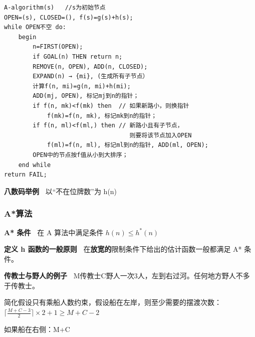 \documentclass[b4paper, 10pt]{ctexart}
\makeatletter
\newenvironment{figurehere}
{\def\@captype{figure}}
{}
\makeatother
\begin{document}
\begin{multicols}{3}
\begin{lstlisting}[basicstyle=\tiny \ttfamily]
A-algorithm(s)   //s为初始节点
OPEN=(s), CLOSED=(), f(s)=g(s)+h(s);
while OPEN不空 do:
    begin
        n=FIRST(OPEN);
        if GOAL(n) THEN return n;
        REMOVE(n, OPEN), ADD(n, CLOSED);
        EXPAND(n) → {mi}, (生成所有子节点）
        计算f(n, mi)=g(n, mi)+h(mi);
        ADD(mj, OPEN), 标记mj到n的指针；
        if f(n, mk)<f(mk) then  // 如果新路小，则换指针
            f(mk)=f(n, mk), 标记mk到n的指针；
        if f(n, ml)<f(ml,) then // 新路小且有子节点，
                                   则要将该节点加入OPEN
            f(ml)=f(n, ml), 标记ml到n的指针, ADD(ml, OPEN);
        OPEN中的节点按f值从小到大排序；
    end while
return FAIL;

\end{lstlisting}

\textbf{八数码举例\ } 以“不在位牌数”为 h(n)




\subsubsection{A*算法}

\textbf{A* 条件\ } 在 A 算法中满足条件 $h(n)\le h^*(n)$ 


\textbf{定义 h 函数的一般原则\ } 在\textbf{放宽的}限制条件下给出的估计函数一般都满足 A* 条件。

\textbf{传教士与野人的例子\ } M传教士C野人一次3人，左到右过河。任何地方野人不多于传教士。

简化假设只有乘船人数约束，假设船在左岸，则至少需要的摆渡次数：
$\lceil \frac{M+C-3}{2} \rceil \times 2 + 1 \ge M + C - 2$

如果船在右侧：M+C


\end{multicols}
\end{document}
